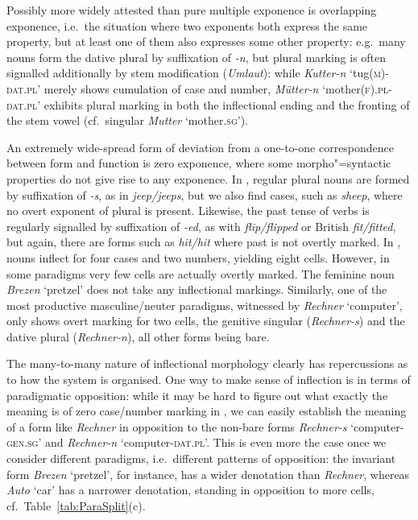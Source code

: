 \documentclass[output=paper
 	        ,biblatex
                ,babelshorthands
                ,newtxmath
                ,draftmode
                ,colorlinks, citecolor=brown
]{langscibook}
\begin{document}
Possibly more widely attested than pure multiple exponence is
overlapping exponence, i.e.\ the situation where two exponents both
express the same property, but at least one of them also expresses
some other property: e.g.\ many  nouns form the dative plural by
suffixation of \textit{-n}, but plural marking is often signalled
additionally by stem modification (\textit{Umlaut}): while
\textit{Kutter-n} `tug(\textsc{m})-\textsc{dat.pl}' merely shows
cumulation of case and number, \textit{Mütter-n}
`mother(\textsc{f}).\textsc{pl}-\textsc{dat.pl}' exhibits plural
marking in both the inflectional ending and the fronting of the stem
vowel (cf.\ singular \textit{Mutter} `mother.\textsc{sg}').

An extremely wide-spread form of deviation from a one-to-one
correspondence between form and function is zero exponence, where some
morpho"=syntactic properties do not give rise to any exponence. In
, regular plural nouns are formed by suffixation of
\textit{-s}, as in \textit{jeep/jeeps}, but we also find cases, such
as \textit{sheep}, where no overt exponent of plural is
present. Likewise, the past tense of  verbs is regularly
signalled by suffixation of \textit{-ed}, as with
\textit{flip/flipped} or British  \textit{fit/fitted}, but
again, there are forms such as \textit{hit/hit} where past is not
overtly marked.  In , nouns inflect for four cases and two
numbers, yielding eight cells. However, in some paradigms very few
cells are actually overtly marked. The feminine noun \textit{Brezen}
`pretzel' does not take any inflectional markings. Similarly, one of
the most productive masculine/neuter paradigms, witnessed by
\textit{Rechner} `computer', only shows overt marking for two cells,
the genitive singular (\textit{Rechner-s}) and the dative plural
(\textit{Rechner-n}), all other forms being bare.



The many-to-many nature of inflectional morphology clearly has
repercussions as to how the system is organised.  One way to make
sense of inflection is in terms of paradigmatic opposition: while it
may be hard to figure out what exactly the meaning is of zero
case/number marking in , we can easily establish the meaning of
a form like \textit{Rechner} in opposition to the non-bare forms
\textit{Rechner-s} `computer-\textsc{gen.sg}' and \textit{Rechner-n}
`computer-\textsc{dat.pl}'. This is even more the case once we
consider different paradigms, i.e.\ different patterns of opposition:
the invariant form \textit{Brezen} `pretzel', for instance, has a wider
denotation than \textit{Rechner}, whereas \textit{Auto}
`car' has a narrower denotation,  standing in
opposition to more cells, cf.\ Table~\ref{tab:ParaSplit}(c).    
\end{document}
